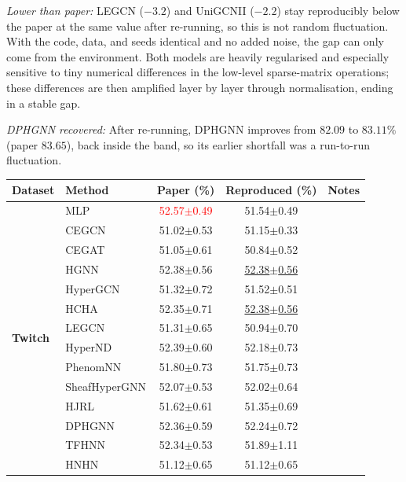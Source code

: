 \documentclass[11pt,a4paper]{article}
\begin{document}
\noindent\textit{Lower than paper:} LEGCN ($-3.2$) and UniGCNII ($-2.2$) stay reproducibly below the paper at the same value after re-running, so this is not random fluctuation. With the code, data, and seeds identical and no added noise, the gap can only come from the environment. Both models are heavily regularised and especially sensitive to tiny numerical differences in the low-level sparse-matrix operations; these differences are then amplified layer by layer through normalisation, ending in a stable gap.

\noindent\textit{DPHGNN recovered:} After re-running, DPHGNN improves from $82.09$ to $83.11\%$ (paper $83.65$), back inside the band, so its earlier shortfall was a run-to-run fluctuation.

\begin{table}[H]
	\centering\small
	\begin{tabular}{llccc}
		\toprule
		Dataset & Method & Paper (\%) & Reproduced (\%) & Notes \\
		\midrule
		\multirow{20}{*}{\textbf{Twitch}} & MLP               & \textcolor{red}{52.57$\pm$0.49}   & 51.54$\pm$0.49   &  \\
		 & CEGCN             & 51.02$\pm$0.53   & 51.15$\pm$0.33   &  \\
		 & CEGAT             & 51.05$\pm$0.61   & 50.84$\pm$0.52   &  \\
		 & HGNN              & 52.38$\pm$0.56   & \underline{52.38$\pm$0.56}   &  \\
		 & HyperGCN          & 51.32$\pm$0.72   & 51.52$\pm$0.51   &  \\
		 & HCHA              & 52.35$\pm$0.71   & \underline{52.38$\pm$0.56}   &  \\
		 & LEGCN             & 51.31$\pm$0.65   & 50.94$\pm$0.70   &  \\
		 & HyperND           & 52.39$\pm$0.60   & 52.18$\pm$0.73   &  \\
		 & PhenomNN          & 51.80$\pm$0.73   & 51.75$\pm$0.73   &  \\
		 & SheafHyperGNN     & 52.07$\pm$0.53   & 52.02$\pm$0.64   &  \\
		 & HJRL              & 51.62$\pm$0.61   & 51.35$\pm$0.69   &  \\
		 & DPHGNN            & 52.36$\pm$0.59   & 52.24$\pm$0.72   &  \\
		 & TFHNN             & 52.34$\pm$0.53   & 51.89$\pm$1.11   &  \\
		 & HNHN              & 51.12$\pm$0.65   & 51.12$\pm$0.65   &  \\

\end{tabular}
\end{table}
\end{document}
